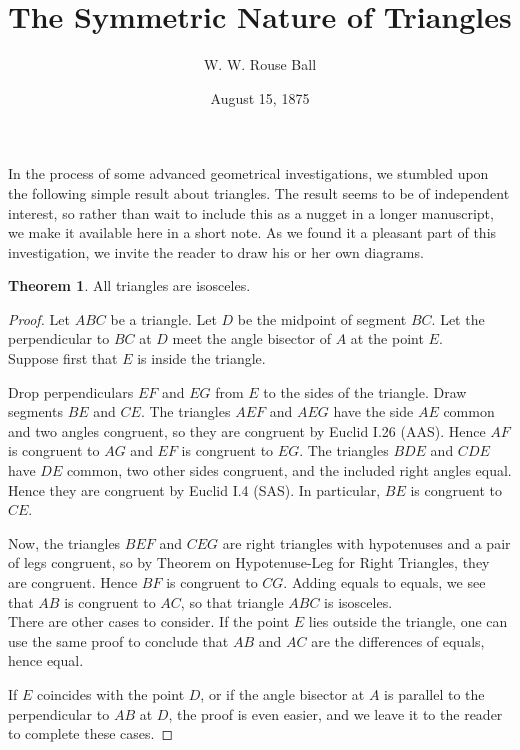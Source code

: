 \documentclass{amsart}
\theoremstyle{definition}
\newtheorem*{theorem}{Theorem}
\begin{document}
\title{The Symmetric Nature of Triangles}
\author{W. W. Rouse Ball}
\date{August 15, 1875}

\maketitle

\thispagestyle{empty}

In the process of some advanced geometrical investigations, we stumbled upon the following simple result about triangles. The result seems to be of independent interest, so rather than wait to include this as a nugget in a longer manuscript, we make it available here in a short note. As we found it a pleasant part of this investigation, we invite the reader to draw his or her own diagrams.

\begin{theorem} 
All triangles are isosceles.
\end{theorem}

\begin{proof} Let $ABC$ be a triangle. Let $D$ be the midpoint of segment $BC$. Let the perpendicular to $BC$ at $D$ meet the angle bisector of $A$ at the point $E$. \\

Suppose first that $E$ is inside the triangle.

Drop perpendiculars $EF$ and $EG$ from $E$ to the sides of the triangle. Draw segments $BE$ and $CE$. The triangles $AEF$ and $AEG$ have the side $AE$ common and two angles congruent, so they are congruent by Euclid I.26 (AAS). Hence $AF$ is congruent to $AG$ and $EF$ is congruent to $EG$. The triangles $BDE$ and $CDE$ have $DE$ common, two other sides congruent, and the included right angles equal. Hence they are congruent by Euclid I.4 (SAS). In particular, $BE$ is congruent to $CE$.

Now, the triangles $BEF$ and $CEG$ are right triangles with hypotenuses and a pair of legs congruent, so by Theorem on Hypotenuse-Leg for Right Triangles, they are congruent. Hence $BF$ is congruent to $CG$. Adding equals to equals, we see that $AB$ is congruent to $AC$, so that triangle $ABC$ is isosceles.\\

There are other cases to consider. If the point $E$ lies outside the triangle, one can use the same proof to conclude that $AB$ and $AC$ are the differences of equals, hence equal.

If $E$ coincides with the point $D$, or if the angle bisector at $A$ is parallel to the perpendicular to $AB$ at $D$, the proof is even easier, and we leave it to the reader to complete these cases.
\end{proof}

\vfill
\end{document}
